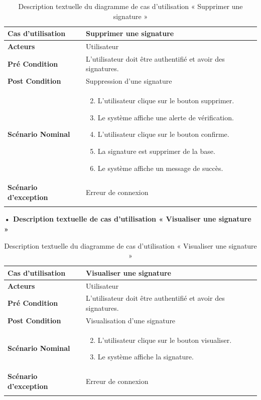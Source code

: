 \begin{longtable}{|p{5cm}|p{10cm}|}
\hline
\textbf{Cas d'utilisation}&Supprimer une signature\\
\hline
\textbf{Acteurs}&Utilisateur \\
\hline
\textbf{Pré Condition}&L'utilisateur doit être authentifié et avoir des signatures.\\
\hline
\textbf{Post Condition}&Suppression  d'une signature\\
\hline
\textbf{Scénario Nominal}&
\vspace{-\baselineskip}
\begin{enumerate}
    \setcounter{enumi}{1}
    \item L'utilisateur clique sur le bouton supprimer.
    \item Le système affiche une alerte de vérification.
    \item L'utilisateur clique sur le bouton confirme.
    \item La signature est supprimer de la base.
    \item Le système affiche un message de succès.
\end{enumerate}\\
\hline
\textbf{Scénario d'exception}&Erreur de connexion\\
\hline
\caption{Description textuelle du diagramme de cas d'utilisation « Supprimer une signature »}
\label{tab:use_case_delete_signature}
\end{longtable}


\textbf{•	Description textuelle de cas d'utilisation « Visualiser une signature »}

\begin{longtable}{|p{5cm}|p{10cm}|}
\hline
\textbf{Cas d'utilisation}&Visualiser une signature\\
\hline
\textbf{Acteurs}&Utilisateur \\
\hline
\textbf{Pré Condition}&L'utilisateur doit être authentifié et avoir des signatures.\\
\hline
\textbf{Post Condition}&Visualisation d'une signature\\
\hline
\textbf{Scénario Nominal}&
\vspace{-\baselineskip}
\begin{enumerate}
    \setcounter{enumi}{1}
    \item L'utilisateur clique sur le bouton visualiser.
    \item Le système affiche la signature.
\end{enumerate}\\
\hline
\textbf{Scénario d'exception}&Erreur de connexion\\
\hline
\caption{Description textuelle du diagramme de cas d'utilisation « Visualiser une signature »}
\label{tab:use_case_view_single_signature}
\end{longtable}

